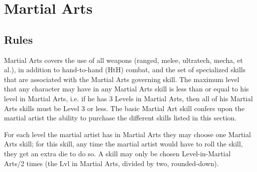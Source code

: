 \documentclass[twoside]{book}
\begin{document}
\begin{multicols}{2}
    


\hspace{-2ex}
\vspace{1ex}


    
\end{multicols}
  
    

\chapter{Martial Arts}
    
    

\section{Rules}
    
    {  
     Martial Arts covers the use of all weapons (ranged,
             melee, ultratech, mecha, et al.), in addition to
             hand-to-hand (HtH) combat, and the set of specialized skills
             that are associated with the Martial Arts governing skill.
             The maximum level that any character may have in any Martial
             Arts skill is less than or equal to his level in Martial
             Arts, i.e. if he has 3 Levels in Martial Arts, then all of
             his Martial Arts skills must be Level 3 or less. The basic
             Martial Art skill confers upon the martial artist the
             ability to purchase the different skills listed in this
             section. 
    }
  
    {  
     For each level the martial artist has in Martial Arts
             they may choose one Martial Arts skill; for this skill, any
             time the martial artist would have to roll the skill, they
             get an extra die to do so. A skill may only be chosen
             Level-in-Martial Arts/2 times (the Lvl in Martial Arts,
             divided by two, rounded-down). 
    }
  
\end{document}
